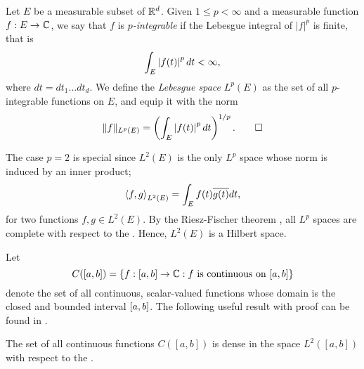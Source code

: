 \documentclass[../thesis.tex]{subfiles}
\begin{document}
\begin{definition}[Lebesgue Space] %
    Let $E$ be a measurable subset of $\mathbb{R}^d$. Given $1 \leq p < \infty$ and a measurable function $f:E\rightarrow \mathbb{C}$, we say that $f$ is \emph{$p$-integrable} if the Lebesgue integral of $|f|^p$ is finite, that is
    \begin{equation*}
        \int_{E} \left|f(t)\right|^p dt < \infty,
    \end{equation*}
    where $dt= dt_1 \dots dt_d$. We define the \emph{Lebesgue space} $L^p(E)$ as the set of all $p$-integrable functions on $E$, and equip it with the norm
    \begin{equation*}
        \|f\|_{L^p(E)} = \left(\int_{E} \left|f(t)\right|^p dt\right)^{1/p}. \qedhere
    \end{equation*}
\end{definition}

The case $p=2$ is special since $L^2(E)$ is the only $L^p$ space whose norm is induced by an inner product;
\begin{equation*}
    \left \langle f, g \right \rangle_{L^2(E)} = \int_{E} f(t)\overline{g(t)} dt,
\end{equation*}
for two functions $f,g\in L^2(E)$. By the Riesz-Fischer theorem \cite[p.~279]{heilIntroductionRealAnalysis2019}, all $L^p$ spaces are complete with respect to the \LPnorm. Hence, $L^2(E)$ is a Hilbert space. 


Let
\begin{equation*}  %
    C([a,b]) = \braq{f:[a,b] \rightarrow \mathbb{C}: f \text{ is continuous on } [a,b]}
\end{equation*}
denote the set of all continuous, scalar-valued functions whose domain is the closed and bounded interval $[a,b]$. The following useful result with proof can be found in \cite[p.~326]{rudinPrinciplesMathematicalAnalysis20}. 
\begin{lemma}\label{lem:c_dense_L2}
    The set of all continuous functions $C([a,b])$ is dense in the space $L^2([a,b])$ with respect to the \Ltwonorm.
\end{lemma}
\end{document}
